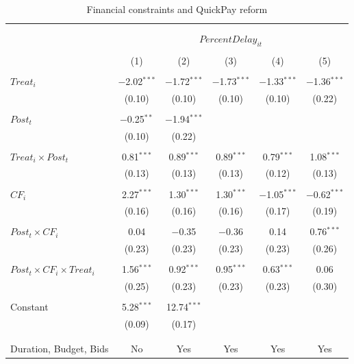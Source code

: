 \documentclass[
]{article}
\begin{document}
\begin{table}[H] \centering 
  \caption{Financial constraints and QuickPay reform} 
  \label{} 
\small 
\begin{tabular}{@{\extracolsep{-2pt}}lccccc} 
\\[-1.8ex]\hline 
\hline \\[-1.8ex] 
\\[-1.8ex] & \multicolumn{5}{c}{$PercentDelay_{it}$  } \\ 
\\[-1.8ex] & (1) & (2) & (3) & (4) & (5)\\ 
\hline \\[-1.8ex] 
 $Treat_i$ & $-$2.02$^{***}$ & $-$1.72$^{***}$ & $-$1.73$^{***}$ & $-$1.33$^{***}$ & $-$1.36$^{***}$ \\ 
  & (0.10) & (0.10) & (0.10) & (0.10) & (0.22) \\ 
  & & & & & \\ 
 $Post_t$ & $-$0.25$^{**}$ & $-$1.94$^{***}$ &  &  &  \\ 
  & (0.10) & (0.22) &  &  &  \\ 
  & & & & & \\ 
 $Treat_i \times Post_t$ & 0.81$^{***}$ & 0.89$^{***}$ & 0.89$^{***}$ & 0.79$^{***}$ & 1.08$^{***}$ \\ 
  & (0.13) & (0.13) & (0.13) & (0.12) & (0.13) \\ 
  & & & & & \\ 
 $CF_i$ & 2.27$^{***}$ & 1.30$^{***}$ & 1.30$^{***}$ & $-$1.05$^{***}$ & $-$0.62$^{***}$ \\ 
  & (0.16) & (0.16) & (0.16) & (0.17) & (0.19) \\ 
  & & & & & \\ 
 $Post_t \times CF_i$ & 0.04 & $-$0.35 & $-$0.36 & 0.14 & 0.76$^{***}$ \\ 
  & (0.23) & (0.23) & (0.23) & (0.23) & (0.26) \\ 
  & & & & & \\ 
 $Post_t \times CF_i \times Treat_i$ & 1.56$^{***}$ & 0.92$^{***}$ & 0.95$^{***}$ & 0.63$^{***}$ & 0.06 \\ 
  & (0.25) & (0.23) & (0.23) & (0.23) & (0.30) \\ 
  & & & & & \\ 
 Constant & 5.28$^{***}$ & 12.74$^{***}$ &  &  &  \\ 
  & (0.09) & (0.17) &  &  &  \\ 
  & & & & & \\ 
\hline \\[-1.8ex] 
Duration, Budget, Bids & No & Yes & Yes & Yes & Yes \\ 

\end{tabular}
\end{table}
\end{document}
